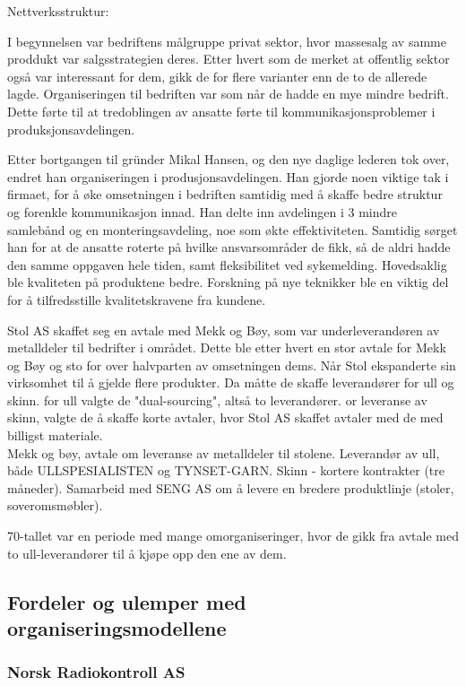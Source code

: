 Nettverksstruktur:

I begynnelsen var bedriftens målgruppe privat sektor, hvor massesalg av samme proddukt var salgsstrategien deres. Etter hvert som de merket  at offentlig sektor også var interessant for dem, gikk de for flere varianter enn de to de allerede lagde. Organiseringen til bedriften var som når de hadde en mye mindre bedrift. Dette førte til at tredoblingen av ansatte førte til kommunikasjonsproblemer i produksjonsavdelingen.

Etter bortgangen til gründer Mikal Hansen, og den nye daglige lederen tok over, endret han organiseringen i produsjonsavdelingen. Han gjorde noen viktige tak i firmaet, for å øke omsetningen i bedriften samtidig med å skaffe bedre struktur og forenkle kommunikasjon innad. Han delte inn avdelingen i 3 mindre samlebånd og en monteringsavdeling, noe som økte effektiviteten. Samtidig sørget han for at de ansatte roterte på hvilke ansvarsområder de fikk, så de aldri hadde den samme oppgaven hele tiden, samt fleksibilitet ved sykemelding. Hovedsaklig ble kvaliteten på produktene bedre. Forskning på nye teknikker ble en viktig del for å tilfredsstille kvalitetskravene fra kundene.   

Stol AS skaffet seg en avtale med Mekk og Bøy, som var underleverandøren av metalldeler til bedrifter i området. Dette ble etter hvert en stor avtale for Mekk og Bøy og sto for over halvparten av omsetningen dems. Når Stol ekspanderte sin virksomhet til å gjelde flere produkter. Da måtte de skaffe leverandører for ull og skinn. for ull valgte de "dual-sourcing", altså to leverandører. or leveranse av skinn, valgte de å skaffe korte avtaler, hvor Stol AS skaffet avtaler med de med billigst materiale. \\


Mekk og bøy, avtale om leveranse av metalldeler til stolene.
Leverandør av ull, både ULLSPESIALISTEN og TYNSET-GARN.
Skinn - kortere kontrakter (tre måneder).
Samarbeid med SENG AS om å levere en bredere produktlinje (stoler, soveromsmøbler).

70-tallet var en periode med mange omorganiseringer, hvor de gikk fra avtale med to ull-leverandører til å kjøpe opp den ene av dem.

\subsection{Fordeler og ulemper med organiseringsmodellene}

\subsubsection{Norsk Radiokontroll AS}


